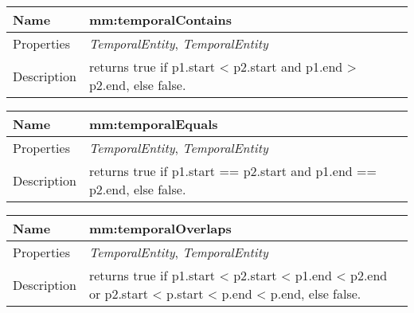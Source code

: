 \vspace{0.3cm}
\newline
\begin{tabular}{|p{3cm}|p{10cm}|}
\hline Name & mm:temporalContains\\
\hline Properties & \textit{TemporalEntity}, \textit{TemporalEntity} \\
\hline Description & returns true if p1.start < p2.start and p1.end > p2.end, else false.\\
\hline
\end{tabular}
\vspace{0.3cm}
\newline
\begin{tabular}{|p{3cm}|p{10cm}|}
\hline Name & mm:temporalEquals\\
\hline Properties & \textit{TemporalEntity}, \textit{TemporalEntity} \\
\hline Description & returns true if p1.start == p2.start and p1.end == p2.end, else false.\\
\hline
\end{tabular}
\vspace{0.3cm}
\newline
\begin{tabular}{|p{3cm}|p{10cm}|}
\hline Name & mm:temporalOverlaps\\
\hline Properties & \textit{TemporalEntity}, \textit{TemporalEntity} \\
\hline Description & returns true if p1.start < p2.start < p1.end < p2.end or p2.start < p.start < p.end < p.end, else false.\\
\hline
\end{tabular}
\vspace{0.3cm}
\newline
